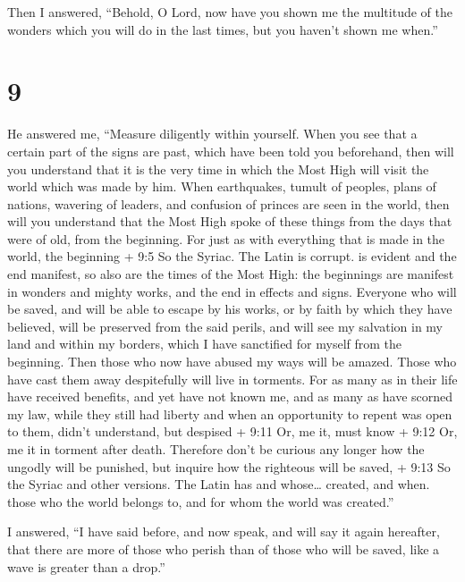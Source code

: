 Then I answered,  ``Behold, O Lord, now have you shown me
the multitude of the wonders which you will do in the last times, but
you haven't shown me when.''

\hypertarget{section-8}{%
\section{9}\label{section-8}}

 He answered me, ``Measure diligently within yourself. When
you see that a certain part of the signs are past, which have been told
you beforehand,  then will you understand that it is the
very time in which the Most High will visit the world which was made by
him.  When earthquakes, tumult of peoples, plans of nations,
wavering of leaders, and confusion of princes are seen in the world,
 then will you understand that the Most High spoke of these
things from the days that were of old, from the beginning. 
For just as with everything that is made in the world, the beginning +
9:5 So the Syriac. The Latin is corrupt. is evident and the end
manifest,  so also are the times of the Most High: the
beginnings are manifest in wonders and mighty works, and the end in
effects and signs.  Everyone who will be saved, and will be
able to escape by his works, or by faith by which they have believed,
 will be preserved from the said perils, and will see my
salvation in my land and within my borders, which I have sanctified for
myself from the beginning.  Then those who now have abused
my ways will be amazed. Those who have cast them away despitefully will
live in torments.  For as many as in their life have
received benefits, and yet have not known me,  and as many
as have scorned my law, while they still had liberty and when an
opportunity to repent was open to them, didn't understand, but despised
+ 9:11 Or, me it,  must know + 9:12 Or, me it in torment
after death.  Therefore don't be curious any longer how the
ungodly will be punished, but inquire how the righteous will be saved, +
9:13 So the Syriac and other versions. The Latin has and whose\ldots{}
created, and when. those who the world belongs to, and for whom the
world was created.''

 I answered,  ``I have said before, and now
speak, and will say it again hereafter, that there are more of those who
perish than of those who will be saved,  like a wave is
greater than a drop.''

